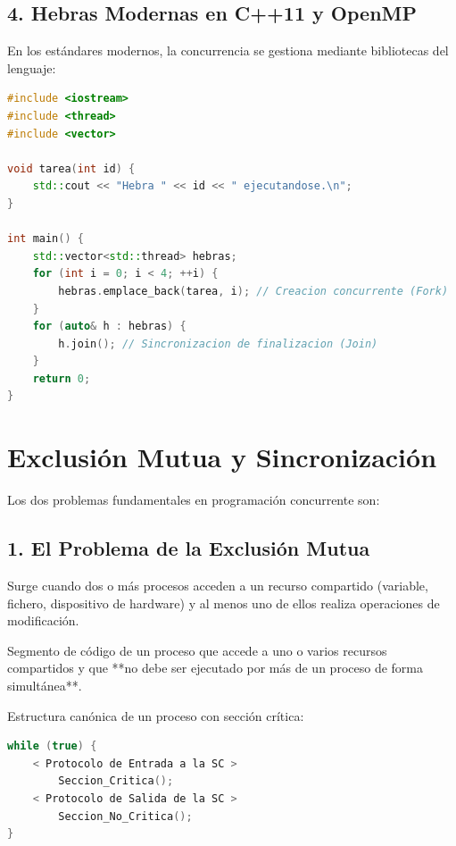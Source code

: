\subsection{4. Hebras Modernas en C++11 y OpenMP}
En los estándares modernos, la concurrencia se gestiona mediante bibliotecas del lenguaje:

\begin{lstlisting}[language=C++,caption={Concurrencia estándar con hebras en C++11}]
#include <iostream>
#include <thread>
#include <vector>

void tarea(int id) {
    std::cout << "Hebra " << id << " ejecutandose.\n";
}

int main() {
    std::vector<std::thread> hebras;
    for (int i = 0; i < 4; ++i) {
        hebras.emplace_back(tarea, i); // Creacion concurrente (Fork)
    }
    for (auto& h : hebras) {
        h.join(); // Sincronizacion de finalizacion (Join)
    }
    return 0;
}
\end{lstlisting}

\section{Exclusión Mutua y Sincronización}

Los dos problemas fundamentales en programación concurrente son:

\subsection{1. El Problema de la Exclusión Mutua}
Surge cuando dos o más procesos acceden a un recurso compartido (variable, fichero, dispositivo de hardware) y al menos uno de ellos realiza operaciones de modificación.
\begin{definicion}
Segmento de código de un proceso que accede a uno o varios recursos compartidos y que **no debe ser ejecutado por más de un proceso de forma simultánea**.
\end{definicion}

Estructura canónica de un proceso con sección crítica:
\begin{lstlisting}[language=C++]
while (true) {
    < Protocolo de Entrada a la SC >
        Seccion_Critica();
    < Protocolo de Salida de la SC >
        Seccion_No_Critica();
}
\end{lstlisting}

